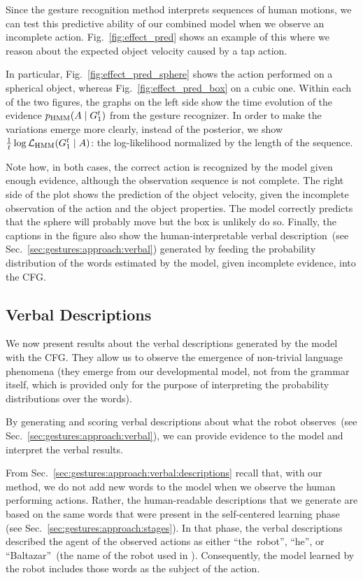 Since the gesture recognition method interprets sequences of human motions, we can test this predictive ability of our combined model when we observe an incomplete action.
Fig.~\ref{fig:effect_pred} shows an example of this where we reason about the expected object velocity caused by a tap action.

In particular, Fig.~\ref{fig:effect_pred_sphere} shows the action performed on a spherical object, whereas Fig.~\ref{fig:effect_pred_box} on a cubic one.
Within each of the two figures, the graphs on the left side show the time evolution of the evidence $p_{\text{HMM}}(A \mid G_1^t)$ from the gesture recognizer.
In order to make the variations emerge more clearly, instead of the posterior, we show $\frac{1}{t} \log \mathcal{L}_\text{HMM} (G_1^t \mid A)$: the log-likelihood normalized by the length of the sequence.

Note how, in both cases, the correct action is recognized by the model given enough evidence, although the observation sequence is not complete.
The right side of the plot shows the prediction of the object velocity, given the incomplete observation of the action and the object properties.
The model correctly predicts that the sphere will probably move but the box is unlikely do so.
Finally, the captions in the figure also show the human-interpretable verbal description~(see Sec.~\ref{sec:gestures:approach:verbal}) generated by feeding the probability distribution of the words estimated by the model, given incomplete evidence, into the \ac{CFG}.

\subsection{Verbal Descriptions}
\label{sec:gestures:results:verbal}

We now present results about the verbal descriptions generated by the model with the \ac{CFG}.
They allow us to observe the emergence of non-trivial language phenomena (they emerge from our developmental model, not from the grammar itself, which is provided only for the purpose of interpreting the probability distributions over the words).

By generating and scoring verbal descriptions about what the robot observes~(see Sec.~\ref{sec:gestures:approach:verbal}), we can provide evidence to the model and interpret the verbal results.

From Sec.~\ref{sec:gestures:approach:verbal:descriptions} recall that, with our method, we do not add new words to the model when we observe the human performing actions.
Rather, the human-readable descriptions that we generate are based on the same words that were present in the self-centered learning phase (see Sec.~\ref{sec:gestures:approach:stages}).
In that phase, the verbal descriptions described the agent of the observed actions as either ``the~robot'', ``he'', or ``Baltazar''~(the name of the robot used in \cite{salvi:2012:smcb}).
Consequently, the \AffWords{} model learned by the robot includes those words as the subject of the action.

